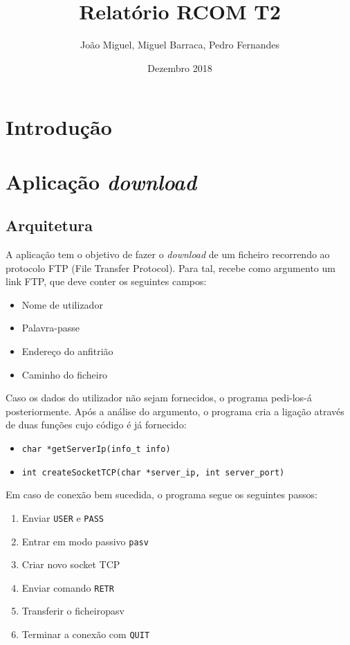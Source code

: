 \documentclass{article}
\title{Relatório RCOM T2}
\author{João Miguel, Miguel Barraca, Pedro Fernandes}
\date{Dezembro 2018}
\begin{document}
\maketitle

\tableofcontents

\section{Introdução}
\section{Aplicação \textit{download}}
\subsection{Arquitetura}

A aplicação tem o objetivo de fazer o \textit{download} de um ficheiro recorrendo ao protocolo
FTP (File Transfer Protocol). Para tal, recebe como argumento um link FTP, que deve conter
os seguintes campos:

\begin{itemize}
\item Nome de utilizador
\item Palavra-passe
\item Endereço do anfitrião
\item Caminho do ficheiro
\end{itemize}

Caso os dados do utilizador não sejam fornecidos, o programa pedi-los-á posteriormente.
Após a análise do argumento, o programa cria a ligação através de duas funções cujo código 
é já fornecido:

\begin{itemize}
\item \texttt{char *getServerIp(info_t info)}
\item \texttt{int createSocketTCP(char *server_ip, int server_port)}
\end{itemize}

Em caso de conexão bem sucedida, o programa segue os seguintes passos:
\begin{enumerate}
\item Enviar \texttt{USER} e \texttt{PASS}
\item Entrar em modo passivo \texttt{pasv}
\item Criar novo socket TCP
\item Enviar comando \texttt{RETR}
\item Transferir o ficheiropasv
\item Terminar a conexão com \texttt{QUIT}
\end{enumerate}
\end{document}
